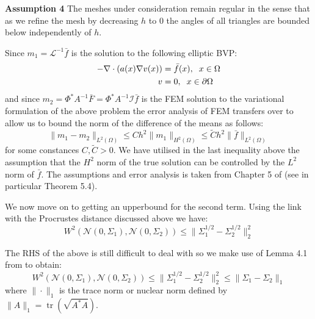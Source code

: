 \noindent \textbf{Assumption 4 } The meshes under consideration remain regular in the sense that as we refine the mesh by decreasing $h$ to 0 the angles of all triangles are bounded below independently of $h$.

Since $m_1=\mathcal{L}^{-1}\bar{f}$ is the solution to the following elliptic BVP:
\begin{align*}
    -\nabla\cdot(a(x)\nabla v(x)) &= \bar{f}(x), \hspace{0.2cm} x\in\Omega \\
    v &= 0, \hspace{0.2cm} x\in\partial\Omega
\end{align*}
and since $m_2=\Phi^{*}A^{-1}\bar{F}=\Phi^{*}A^{-1}\mathcal{I}\bar{f}$ is the FEM solution to the variational formulation of the above problem the error analysis of FEM transfers over to allow us to bound the norm of the difference of the means as follows:
\begin{equation}
    \label{bound_on_diff_means}
    \|m_1-m_2\|_{L^{2}(\Omega)}\leq Ch^{2}\|m_{1}\|_{H^{2}(\Omega)}\leq\tilde{C}h^{2}\|\bar{f}\|_{L^{2}(\Omega)}
\end{equation}
for some constances $C,\tilde{C}>0$. We have utilised in the last inequality above the assumption that the $H^2$ norm of the true solution can be controlled by the $L^2$ norm of $\bar{f}$. The assumptions and error analysis is taken from Chapter 5 of \textcolor{blue}{\cite{larsson2008partial}} (see in particular Theorem 5.4).

We now move on to getting an upperbound for the second term. Using the link with the Procrustes distance discussed above we have:
\begin{equation}
    W^2(\mathcal{N}(0,\Sigma_1),\mathcal{N}(0,\Sigma_2))\leq\|\Sigma_{1}^{1/2}-\Sigma_{2}^{1/2}\|_{2}^{2}
\end{equation}

The RHS of the above is still difficult to deal with so we make use of Lemma 4.1 from \textcolor{blue}{\cite{powers1970free}} to obtain:
\begin{equation}
    W^2(\mathcal{N}(0,\Sigma_1),\mathcal{N}(0,\Sigma_2))\leq\|\Sigma_{1}^{1/2}-\Sigma_{2}^{1/2}\|_{2}^{2}\leq\|\Sigma_1-\Sigma_2\|_{1}
\end{equation}
where $\|\cdot\|_1$ is the trace norm or nuclear norm defined by $\|A\|_{1}=\operatorname{tr}(\sqrt{A^{*}A})$.

